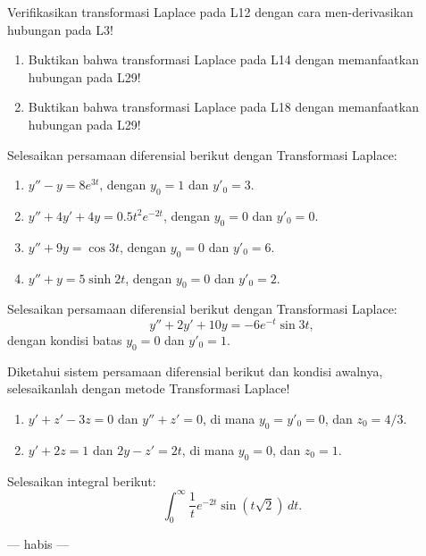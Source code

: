 \documentclass[11pt,a4paper]{article}
\begin{document}
\begin{taskbox}[title={Soal 5},fonttitle=\bfseries,colbacktitle=iteraBlue,coltitle=white]
Verifikasikan transformasi Laplace pada L12 dengan cara men-derivasikan hubungan pada L3!
\end{taskbox}
\begin{taskbox}[title={Soal 6},fonttitle=\bfseries,colbacktitle=iteraBlue,coltitle=white]
\begin{enumerate}[label=3\alph*.]
\item Buktikan bahwa transformasi Laplace pada L14 dengan memanfaatkan hubungan pada L29!
\item Buktikan bahwa transformasi Laplace pada L18 dengan memanfaatkan hubungan pada L29!
\end{enumerate}
\end{taskbox}
\begin{taskbox}[title={Soal 7},fonttitle=\bfseries,colbacktitle=iteraBlue,coltitle=white]
Selesaikan persamaan diferensial berikut dengan Transformasi Laplace:
\begin{enumerate}[label=1\alph*.]
\item $y''-y=8e^{3t}$, dengan $y_0=1$ dan $y'_0=3$.
\item $y''+4y'+4y=0.5t^2e^{-2t}$, dengan $y_0=0$ dan $y'_0=0$.
\item $y''+9y=\cos 3t$, dengan $y_0=0$ dan $y'_0=6$.
\item $y''+y=5\sinh 2t$, dengan $y_0=0$ dan $y'_0=2$.
\end{enumerate}
\end{taskbox}
\begin{taskbox}[title={Soal 8},fonttitle=\bfseries,colbacktitle=iteraBlue,coltitle=white]
Selesaikan persamaan diferensial berikut dengan Transformasi Laplace:
\[
y''+2y'+10y=-6e^{-t}\sin 3t,
\]
dengan kondisi batas $y_0=0$ dan $y'_0=1$.
\end{taskbox}
\begin{taskbox}[title={Soal 9},fonttitle=\bfseries,colbacktitle=iteraBlue,coltitle=white]
Diketahui sistem persamaan diferensial berikut dan kondisi awalnya, selesaikanlah dengan metode Transformasi Laplace!
\begin{enumerate}[label=2\alph*.]
\item $y'+z'-3z=0$ dan $y''+z'=0$, di mana $y_0=y'_0=0$, dan $z_0=4/3$.
\item $y'+2z=1$ dan $2y-z'=2t$, di mana $y_0=0$, dan $z_0=1$.
\end{enumerate}
\end{taskbox}
\begin{taskbox}[title={Soal 10},fonttitle=\bfseries,colbacktitle=iteraBlue,coltitle=white]
Selesaikan integral berikut:
\[
\int_0^\infty \frac{1}{t}e^{-2t}\sin\left(t\sqrt{2}\right)\,dt.
\]
\end{taskbox}
\vfill\begin{center}--- habis ---\end{center}
\end{document}
